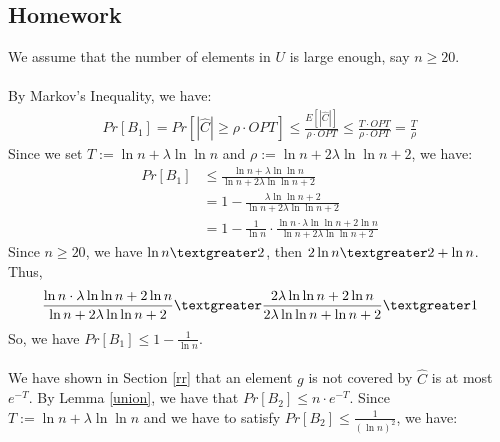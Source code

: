 \subsection{Homework}
We assume that the number of elements in $U$ is large enough, say $n \ge 20$.\\
\\
By Markov's Inequality, we have:
\begin{align}
  \nonumber Pr[B_1]=Pr[|\widehat{C}|\ge \rho \cdot OPT]\le \frac{E[|\widehat{C}|]}{\rho \cdot OPT}\le  \frac{T\cdot OPT}{\rho \cdot OPT} = \frac{T}{\rho}
\end{align}
Since we set $T := \ln n + \lambda \ln \ln n$ and $\rho:=\ln n+2\lambda \ln\ln n +2$, we have:
\begin{align}
  \nonumber Pr[B_1] &\le \frac{\ln n + \lambda \ln \ln n}{\ln n+2\lambda \ln\ln n +2}\\
  \nonumber &=1-\frac{\lambda\ln\ln n+2}{\ln n + 2 \lambda \ln \ln n +2}\\
  \nonumber &=1-\frac{1}{\ln n}\cdot \frac{\ln n \cdot \lambda \ln \ln n +2\ln n}{\ln n + 2\lambda \ln\ln n +2 }
\end{align}
Since $n\ge 20$, we have $\ln n \textgreater 2$, then $2\ln n \textgreater 2+\ln n$.
Thus,
\begin{align}
  \nonumber \frac{\ln n \cdot \lambda \ln \ln n +2\ln n}{\ln n + 2\lambda \ln\ln n +2 }
  \textgreater \frac{2\lambda \ln \ln n +2\ln n}{2\lambda \ln\ln n+\ln n +2}
  \textgreater 1
\end{align}
So, we have $Pr[B_1]\le 1-\frac{1}{\ln n}$.\\
\\
We have shown in Section \ref{rr} that an element $g$ is not covered by $\widehat{C}$ is at most $e^{-T}$.
By Lemma \ref{union}, we have that $Pr[B_2]\le n\cdot e^{-T}$.
Since $T := \ln n + \lambda \ln \ln n$ and we have to satisfy  $Pr[B_2]\le \frac{1}{(\ln n)^2}$, we have:
